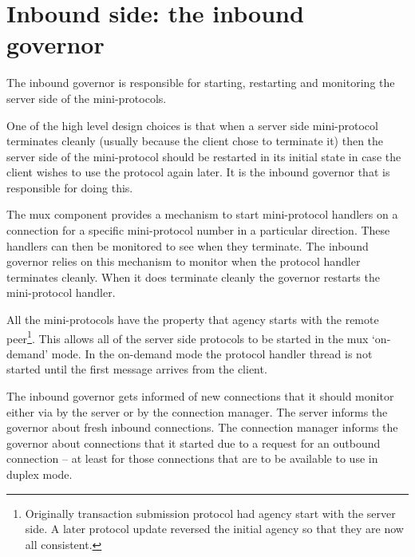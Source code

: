 \section{Inbound side: the inbound governor}

The inbound governor is responsible for starting, restarting and monitoring the
server side of the mini-protocols.

One of the high level design choices is that when a server side mini-protocol
terminates cleanly (usually because the client chose to terminate it) then the
server side of the mini-protocol should be restarted in its initial state in
case the client wishes to use the protocol again later. It is the inbound
governor that is responsible for doing this.

The mux component provides a mechanism to start mini-protocol handlers on a
connection for a specific mini-protocol number in a particular direction. These
handlers can then be monitored to see when they terminate. The inbound governor
relies on this mechanism to monitor when the protocol handler terminates
cleanly. When it does terminate cleanly the governor restarts the mini-protocol
handler.

All the mini-protocols have the property that agency starts with the remote
peer\footnote{Originally transaction submission protocol had agency start with the
server side. A later protocol update reversed the initial agency so that they
are now all consistent.}. This allows all of the server side protocols to be
started in the mux `on-demand' mode. In the on-demand mode the protocol handler
thread is not started until the first message arrives from the client.

The inbound governor gets informed of new connections that it should monitor
either via by the server or by the connection manager. The server informs the
governor about fresh inbound connections. The connection manager informs the
governor about connections that it started due to a request for an outbound
connection -- at least for those connections that are to be available to use in
duplex mode.

